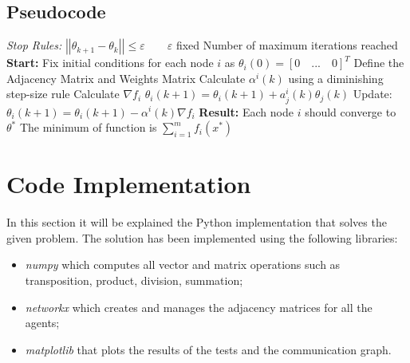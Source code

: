 \documentclass[a4paper,11pt,oneside]{book}
\begin{document}
\subsection {Pseudocode} \label{Subsec1.1.3}
\begin{algorithm}
\caption{}
\begin{algorithmic} [1]
\State \textit{Stop Rules:}
\State $\left|\left|\theta_{k+1} - \theta_k\right|\right|  \leq \varepsilon \qquad \varepsilon$ fixed
\State Number of maximum iterations reached
\State \textbf{Start:}
\State Fix initial conditions for each node $i$ as $\theta_i(0) = [0 \quad ... \quad 0]^T$
\State Define the Adjacency Matrix and Weights Matrix
	\State Calculate $\alpha^i(k)$ using a diminishing step-size rule
    \State Calculate $\nabla f_i$
        \State $\theta_i(k+1) = \theta_i(k+1) + a^i_j(k) \theta_j(k)$
    \EndFor
    \State Update: $\theta_i(k+1) = \theta_i(k+1) - \alpha^i(k) \nabla f_i$
\EndWhile
\State \textbf{Result:}
\State Each node $i$ should converge to $\theta^*$
\State The minimum of function is $\sum \limits_{i=1}^{m}f_i(x^*)$
\end{algorithmic}
\end{algorithm}


\section {Code Implementation} \label{Sec1.2}

In this section it will be explained the Python implementation that solves the given problem. The solution has been implemented using the following libraries:
\begin{itemize}
	\item  \textit{numpy} which computes all vector and matrix operations such as transposition, product, division,
	summation;
	\item \textit{networkx} which creates and manages the adjacency matrices for all the agents;
	\item \textit{matplotlib} that plots the results
	of the tests and the communication graph.
\end{itemize}
\end{document}
